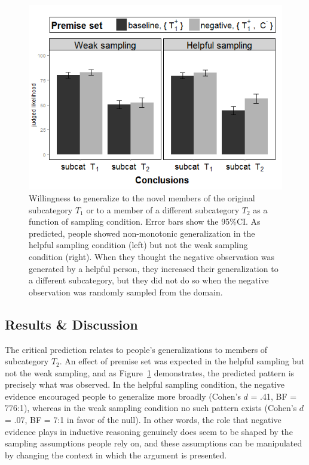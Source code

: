 \documentclass[authoryear,11pt]{elsarticle}
\begin{document}
\begin{figure}[t!]
\begin{center}
\includegraphics[scale=.5]{fig/exp3_gen_all.png}
\caption{Willingness to generalize to the novel members of the original subcategory $T_1$ or to a member of a different subcategory $T_2$ as a function of sampling condition. Error bars show the 95\%CI. As predicted, people showed non-monotonic generalization in the {\sc helpful sampling} condition (left) but not the {\sc weak sampling} condition (right). When they thought the negative observation was generated by a helpful person, they increased their generalization to a different subcategory, but they did not do so when the negative observation was randomly sampled from the domain.}
\label{fig:exp3_me}
\end{center}
\end{figure}

\subsection{Results \& Discussion}

The critical prediction relates to people's generalizations to members of subcategory $T_2$. An effect of premise set was expected in the {\sc helpful sampling} but not the {\sc weak sampling}, and as Figure~\ref{fig:exp3_me} demonstrates, the predicted pattern is precisely what was observed. In the {\sc helpful sampling} condition, the negative evidence encouraged people to generalize more broadly (Cohen's $d$ = .41, BF = 776:1), whereas in the {\sc weak sampling} condition no such pattern exists (Cohen's $d$ = .07, BF = 7:1 in favor of the null). In other words, the role that negative evidence plays in inductive reasoning genuinely does seem to be shaped by the sampling assumptions people rely on, and these assumptions can be manipulated by changing the context in which the argument is presented.
\end{document}
